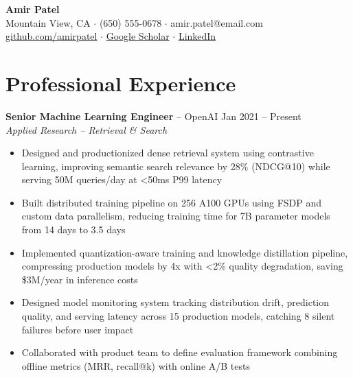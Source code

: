 \documentclass[11pt,letterpaper]{article}
\begin{document}
{\Large\bfseries Amir Patel}\\[4pt]
{\small Mountain View, CA $\cdot$ (650) 555-0678 $\cdot$ amir.patel@email.com}\\
{\small \href{https://github.com/amirpatel}{github.com/amirpatel} $\cdot$ \href{https://scholar.google.com/amirpatel}{Google Scholar} $\cdot$ \href{https://linkedin.com/in/amirpatel}{LinkedIn}}


\section{Professional Experience}

\textbf{Senior Machine Learning Engineer} -- OpenAI \hfill Jan 2021 -- Present\\
{\itshape Applied Research -- Retrieval \& Search}
\begin{itemize}
    \item Designed and productionized dense retrieval system using contrastive learning, improving semantic search relevance by 28\% (NDCG@10) while serving 50M queries/day at <50ms P99 latency
    \item Built distributed training pipeline on 256 A100 GPUs using FSDP and custom data parallelism, reducing training time for 7B parameter models from 14 days to 3.5 days
    \item Implemented quantization-aware training and knowledge distillation pipeline, compressing production models by 4x with <2\% quality degradation, saving \$3M/year in inference costs
    \item Designed model monitoring system tracking distribution drift, prediction quality, and serving latency across 15 production models, catching 8 silent failures before user impact
    \item Collaborated with product team to define evaluation framework combining offline metrics (MRR, recall@k) with online A/B tests
\end{itemize}
\end{document}
